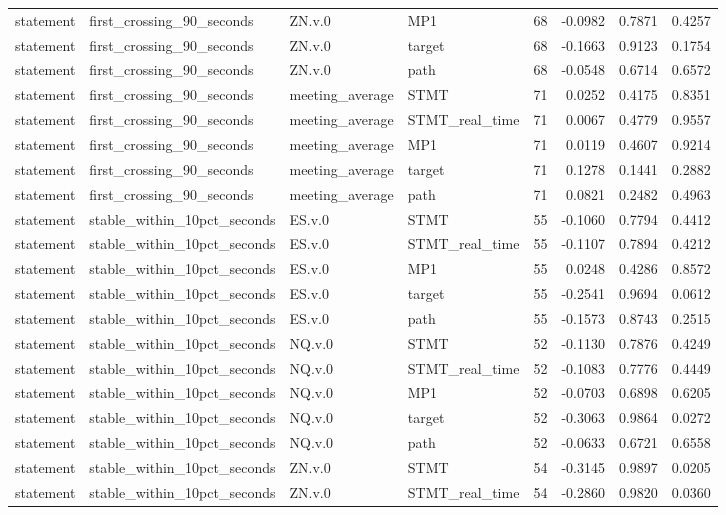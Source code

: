 \begin{tabular}{llllrrrr}
statement & first_crossing_90_seconds & ZN.v.0 & MP1 & 68 & -0.0982 & 0.7871 & 0.4257 \\
statement & first_crossing_90_seconds & ZN.v.0 & target & 68 & -0.1663 & 0.9123 & 0.1754 \\
statement & first_crossing_90_seconds & ZN.v.0 & path & 68 & -0.0548 & 0.6714 & 0.6572 \\
statement & first_crossing_90_seconds & meeting_average & STMT & 71 & 0.0252 & 0.4175 & 0.8351 \\
statement & first_crossing_90_seconds & meeting_average & STMT_real_time & 71 & 0.0067 & 0.4779 & 0.9557 \\
statement & first_crossing_90_seconds & meeting_average & MP1 & 71 & 0.0119 & 0.4607 & 0.9214 \\
statement & first_crossing_90_seconds & meeting_average & target & 71 & 0.1278 & 0.1441 & 0.2882 \\
statement & first_crossing_90_seconds & meeting_average & path & 71 & 0.0821 & 0.2482 & 0.4963 \\
statement & stable_within_10pct_seconds & ES.v.0 & STMT & 55 & -0.1060 & 0.7794 & 0.4412 \\
statement & stable_within_10pct_seconds & ES.v.0 & STMT_real_time & 55 & -0.1107 & 0.7894 & 0.4212 \\
statement & stable_within_10pct_seconds & ES.v.0 & MP1 & 55 & 0.0248 & 0.4286 & 0.8572 \\
statement & stable_within_10pct_seconds & ES.v.0 & target & 55 & -0.2541 & 0.9694 & 0.0612 \\
statement & stable_within_10pct_seconds & ES.v.0 & path & 55 & -0.1573 & 0.8743 & 0.2515 \\
statement & stable_within_10pct_seconds & NQ.v.0 & STMT & 52 & -0.1130 & 0.7876 & 0.4249 \\
statement & stable_within_10pct_seconds & NQ.v.0 & STMT_real_time & 52 & -0.1083 & 0.7776 & 0.4449 \\
statement & stable_within_10pct_seconds & NQ.v.0 & MP1 & 52 & -0.0703 & 0.6898 & 0.6205 \\
statement & stable_within_10pct_seconds & NQ.v.0 & target & 52 & -0.3063 & 0.9864 & 0.0272 \\
statement & stable_within_10pct_seconds & NQ.v.0 & path & 52 & -0.0633 & 0.6721 & 0.6558 \\
statement & stable_within_10pct_seconds & ZN.v.0 & STMT & 54 & -0.3145 & 0.9897 & 0.0205 \\
statement & stable_within_10pct_seconds & ZN.v.0 & STMT_real_time & 54 & -0.2860 & 0.9820 & 0.0360 \\

\end{tabular}
